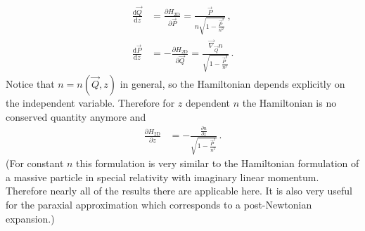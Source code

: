 \documentclass[12pt,a4paper,twoside,openright,BCOR10mm,headsepline,titlepage,abstracton,chapterprefix,final]{scrreprt}
\begin{document}
\begin{subequations}
\label{eq:H2Deom}
\begin{align}
 \frac{\text{d}\vec{Q}}{\text{d}z} &= \frac{\partial H_{\text{2D}}}{\partial \vec{P}} = \frac{\vec{P}}{n \sqrt{1 - \frac{\vec{P}^2}{n^2}}}\,,\\
 \frac{\text{d}\vec{P}}{\text{d}z} &= -\frac{\partial H_{\text{2D}}}{\partial \vec{Q}} = \frac{\vec{\nabla}_{\vec{Q}} n}{\sqrt{1 - \frac{\vec{P}^2}{n^2}}}\,.    
\end{align}
\end{subequations}
Notice that $n = n(\vec{Q}, z)$ in general, so the Hamiltonian depends explicitly on the independent variable.
Therefore for $z$ dependent $n$ the Hamiltonian is no conserved quantity anymore and
\begin{align}
 \frac{\partial H_{\text{2D}}}{\partial z} &= -\frac{\frac{\partial n}{\partial z}}{\sqrt{1 - \frac{\vec{P}^2}{n^2}}}\,.
\end{align}
(For constant $n$ this formulation is very similar to the Hamiltonian formulation of a 
massive particle in special relativity with imaginary linear momentum.
Therefore nearly all of the results there are applicable here. It is also very useful 
for the paraxial approximation which corresponds to a post-Newtonian expansion.)
\end{document}
